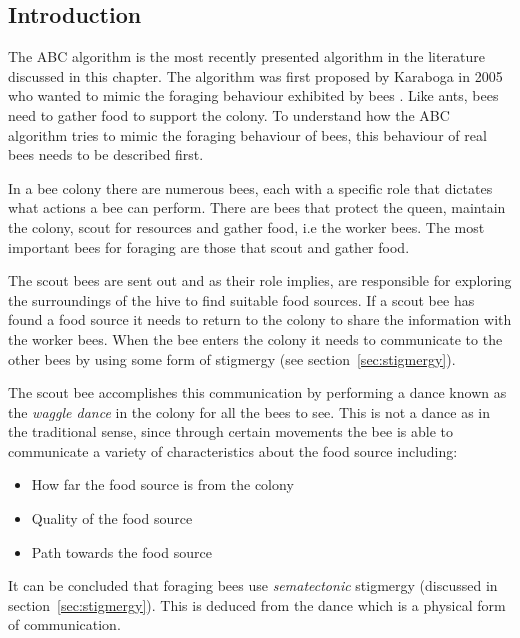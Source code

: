 \subsection{Introduction}
The ABC algorithm is the most recently presented algorithm in the literature discussed in this chapter\cite{ABCCompareStudy,ABCLeafConstrained,ABCNumericalOptimization}. The algorithm was first proposed by Karaboga in 2005 who wanted to mimic the foraging behaviour exhibited by bees \cite{ABCCompareStudy,ABCLeafConstrained,ABCNumericalOptimization}. Like ants, bees need to gather food to support the colony. To understand how the ABC algorithm tries to mimic the foraging behaviour of bees, this behaviour of real bees needs to be described first\cite{ABCCompareStudy}. 

In a bee colony there are numerous bees, each with a specific role that dictates what actions a bee can perform. There are bees that protect the queen, maintain the colony, scout for resources and gather food, i.e the worker bees. The most important bees for foraging are those that scout and gather food\cite{ABCCompareStudy}. 

The scout bees are sent out and as their role implies, are responsible for exploring the surroundings of the hive to find suitable food sources\cite{ABCCompareStudy}. If a scout bee has found a food source it needs to return to the colony to share the information with the worker bees\cite{ABCCompareStudy}. When the bee enters the colony it needs to communicate to the other bees by using some form of stigmergy (see section~\ref{sec:stigmergy})\cite{ABCCompareStudy}.

The scout bee accomplishes this communication by performing a dance known as the \emph{waggle dance} in the colony for all the bees to see\cite{ABCCompareStudy}. This is not a dance as in the traditional sense, since through certain movements the bee is able to communicate a variety of characteristics about the food source including\cite{ABCCompareStudy}:
\begin{itemize}
\item How far the food source is from the colony
\item Quality of the food source
\item Path towards the food source
\end{itemize}

It can be concluded that foraging bees use \emph{sematectonic} stigmergy (discussed in section~\ref{sec:stigmergy}). This is deduced from the dance which is a physical form of communication.

